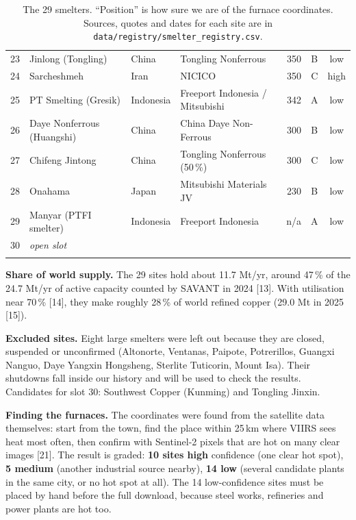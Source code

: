 \documentclass[10pt,a4paper]{article}
\newcommand{\code}[1]{\texttt{\small #1}}
\begin{document}
{\begin{longtable}{@{}r l l l r c c@{}}
23 & Jinlong (Tongling) & China & Tongling Nonferrous & 350 & B & low\\
24 & Sarcheshmeh & Iran & NICICO & 350 & C & high\\
25 & PT Smelting (Gresik) & Indonesia & Freeport Indonesia / Mitsubishi & 342 & A & low\\
26 & Daye Nonferrous (Huangshi) & China & China Daye Non-Ferrous & 300 & B & low\\
27 & Chifeng Jintong & China & Tongling Nonferrous (50\,\%) & 300 & C & low\\
28 & Onahama & Japan & Mitsubishi Materials JV & 230 & B & low\\
29 & Manyar (PTFI smelter) & Indonesia & Freeport Indonesia & n/a & A & low\\
30 & \emph{open slot} & & & & & \\
\bottomrule
\caption{The 29 smelters. ``Position'' is how sure we are of the furnace coordinates. Sources, quotes and dates for each site are in \code{data/registry/smelter\_registry.csv}.}
\end{longtable}
}

\textbf{Share of world supply.} The 29 sites hold about 11.7 Mt/yr, around 47\,\% of the 24.7 Mt/yr of active capacity counted by SAVANT in 2024 [13]. With utilisation near 70\,\% [14], they make roughly 28\,\% of world refined copper (29.0 Mt in 2025 [15]).

\textbf{Excluded sites.} Eight large smelters were left out because they are closed, suspended or unconfirmed (Altonorte, Ventanas, Paipote, Potrerillos, Guangxi Nanguo, Daye Yangxin Hongsheng, Sterlite Tuticorin, Mount Isa). Their shutdowns fall inside our history and will be used to check the results. Candidates for slot 30: Southwest Copper (Kunming) and Tongling Jinxin.

\textbf{Finding the furnaces.} The coordinates were found from the satellite data themselves: start from the town, find the place within 25\,km where VIIRS sees heat most often, then confirm with Sentinel-2 pixels that are hot on many clear images [21]. The result is graded: \textbf{10 sites high} confidence (one clear hot spot), \textbf{5 medium} (another industrial source nearby), \textbf{14 low} (several candidate plants in the same city, or no hot spot at all). The 14 low-confidence sites must be placed by hand before the full download, because steel works, refineries and power plants are hot too.

\end{document}
